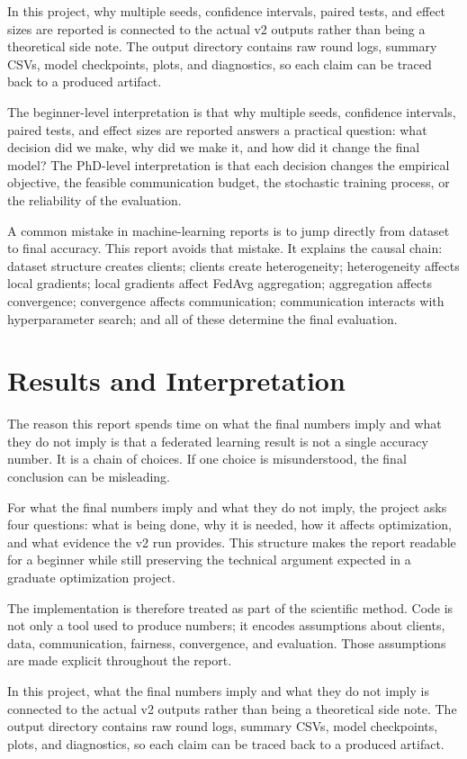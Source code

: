 \documentclass[11pt]{report}
\begin{document}
In this project, why multiple seeds, confidence intervals, paired tests, and effect sizes are
reported is connected to the actual v2 outputs rather than being a theoretical side note. The output
directory contains raw round logs, summary CSVs, model checkpoints, plots, and diagnostics, so each
claim can be traced back to a produced artifact.

The beginner-level interpretation is that why multiple seeds, confidence intervals, paired tests,
and effect sizes are reported answers a practical question: what decision did we make, why did we
make it, and how did it change the final model? The PhD-level interpretation is that each decision
changes the empirical objective, the feasible communication budget, the stochastic training process,
or the reliability of the evaluation.

A common mistake in machine-learning reports is to jump directly from dataset to final accuracy.
This report avoids that mistake. It explains the causal chain: dataset structure creates clients;
clients create heterogeneity; heterogeneity affects local gradients; local gradients affect FedAvg
aggregation; aggregation affects convergence; convergence affects communication; communication
interacts with hyperparameter search; and all of these determine the final evaluation.

\chapter{Results and Interpretation}
The reason this report spends time on what the final numbers imply and what they do not imply is
that a federated learning result is not a single accuracy number. It is a chain of choices. If one
choice is misunderstood, the final conclusion can be misleading.

For what the final numbers imply and what they do not imply, the project asks four questions: what
is being done, why it is needed, how it affects optimization, and what evidence the v2 run provides.
This structure makes the report readable for a beginner while still preserving the technical
argument expected in a graduate optimization project.

The implementation is therefore treated as part of the scientific method. Code is not only a tool
used to produce numbers; it encodes assumptions about clients, data, communication, fairness,
convergence, and evaluation. Those assumptions are made explicit throughout the report.

In this project, what the final numbers imply and what they do not imply is connected to the actual
v2 outputs rather than being a theoretical side note. The output directory contains raw round logs,
summary CSVs, model checkpoints, plots, and diagnostics, so each claim can be traced back to a
produced artifact.
\end{document}
